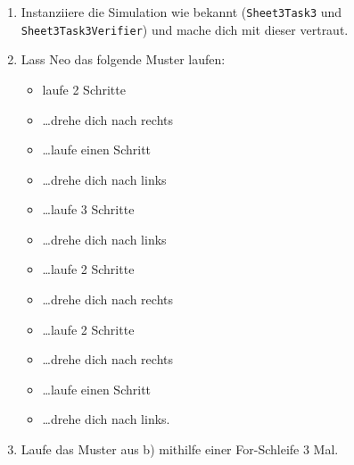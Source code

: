 
\begin{enumerate}
	\item 
	Instanziiere die Simulation wie bekannt (\lstinline{Sheet3Task3} und \lstinline{Sheet3Task3Verifier}) und mache dich mit dieser vertraut.
	\item
		Lass Neo das folgende Muster laufen:
		\begin{itemize}
			\item[] laufe 2 Schritte
			\item[] …drehe dich nach rechts
			\item[] …laufe einen Schritt
			\item[] …drehe dich nach links
			\item[] …laufe 3 Schritte
			\item[] …drehe dich nach links
			\item[] …laufe 2 Schritte
			\item[] …drehe dich nach rechts
			\item[] …laufe 2 Schritte
			\item[] …drehe dich nach rechts
			\item[] …laufe einen Schritt
			\item[] …drehe dich nach links.
		\end{itemize}
	\item
		Laufe das Muster aus b) mithilfe einer For-Schleife 3 Mal.
\end{enumerate}


